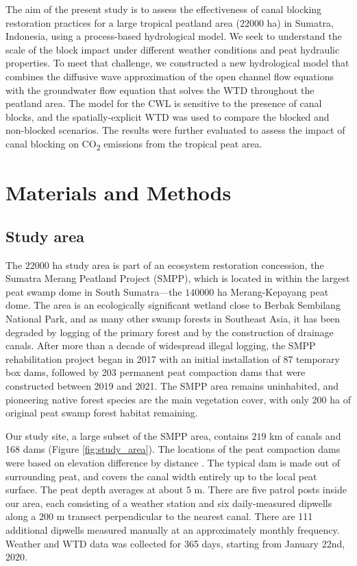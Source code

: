 \documentclass[bg, manuscript]{copernicus}
\begin{document}
The aim of the present study is to assess the effectiveness of canal blocking restoration practices for a large tropical peatland area ($22000$ \unit{ha}) in Sumatra, Indonesia, using a process-based hydrological model.
We seek to understand the scale of the block impact under different weather conditions and  peat hydraulic properties.
To meet that challenge, we constructed a new hydrological model that combines the diffusive wave approximation of the open channel flow equations with the groundwater flow equation that solves the WTD throughout the peatland area.
The model for the CWL is sensitive to the presence of canal blocks, and the spatially-explicit WTD was used to compare the blocked and non-blocked scenarios.
The results were further evaluated to assess the impact of canal blocking on CO\textsubscript{2} emissions from the tropical peat area.


\section{Materials and Methods}
\subsection{Study area}
The $22000$ \unit{ha} study area is part of an ecosystem restoration concession, the Sumatra Merang Peatland Project (SMPP), which is located in within the largest peat swamp dome in South Sumatra---the $140000$ \unit{ha} Merang-Kepayang peat dome.
The area is an ecologically significant wetland close to Berbak Sembilang National Park, and as many other swamp forests in Southeast Asia, it has been degraded by logging of the primary forest and by the construction of drainage canals.
After more than a decade of widespread illegal logging, the SMPP rehabilitation project  began in 2017 with an initial installation of 87 temporary box dams, followed by 203 permanent peat compaction dams that were constructed between 2019 and 2021.
The SMPP area remains uninhabited, and pioneering native forest species are the main vegetation cover, with only 200 ha of original peat swamp forest habitat remaining.

Our study site, a large subset of the SMPP area, contains  $219$ \unit{km} of canals and 168 dams (Figure \ref{fig:study_area}).
The locations of the peat compaction dams  were based on elevation difference by distance \citep{jaenickePlanningHydrologicalRestoration2010}.
The typical dam is made out of surrounding peat, and covers the canal width entirely up to the local peat surface.
The peat depth averages at about $5$ \unit{m}.
There are five patrol posts inside our area, each consisting of a weather station and six daily-measured dipwells along a $200$ \unit{m} transect perpendicular to the nearest canal. 
There are 111 additional dipwells measured manually at an approximately monthly frequency.
Weather and WTD data was collected for 365 days, starting from January 22nd, 2020.
\end{document}
